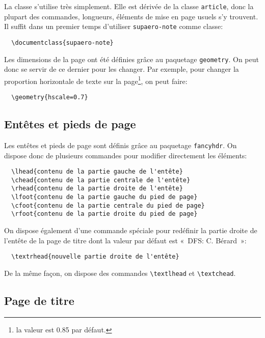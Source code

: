 \documentclass[french]{supaero-note}
\begin{document}
La classe s'utilise très simplement. Elle est dérivée de la classe
\texttt{article}, donc la plupart des commandes, longueurs, éléments
de mise en page usuels s'y trouvent. Il suffit dans un premier temps
d'utiliser \texttt{supaero-note} comme classe:

\begin{verbatim}
  \documentclass{supaero-note}
\end{verbatim}

Les dimensions de la page ont été définies grâce au paquetage
\texttt{geometry}. On peut donc se servir de ce dernier pour les
changer. Par exemple, pour changer la proportion horizontale de texte
sur la page\footnote{la valeur est 0.85 par défaut.}, on peut faire:

\begin{verbatim}
  \geometry{hscale=0.7}
\end{verbatim}

\subsection{Entêtes et pieds de page}
\label{sec:entetes-et-pieds}

Les entêtes et pieds de page sont définis grâce au paquetage
\texttt{fancyhdr}. On dispose donc de plusieurs commandes pour
modifier directement les éléments:

\begin{verbatim}
  \lhead{contenu de la partie gauche de l'entête}
  \chead{contenu de la partie centrale de l'entête}
  \rhead{contenu de la partie droite de l'entête}
  \lfoot{contenu de la partie gauche du pied de page}
  \cfoot{contenu de la partie centrale du pied de page}
  \rfoot{contenu de la partie droite du pied de page}
\end{verbatim}

On dispose également d'une commande spéciale pour redéfinir la partie
droite de l'entête de la page de titre dont la valeur par défaut est
«~DFS: C. Bérard~»:

\begin{verbatim}
  \textrhead{nouvelle partie droite de l'entête}
\end{verbatim}

De la même façon, on dispose des commandes \verb!\textlhead! et
\verb!\textchead!.

\subsection{Page de titre}
\label{sec:page-de-titre}
\end{document}

